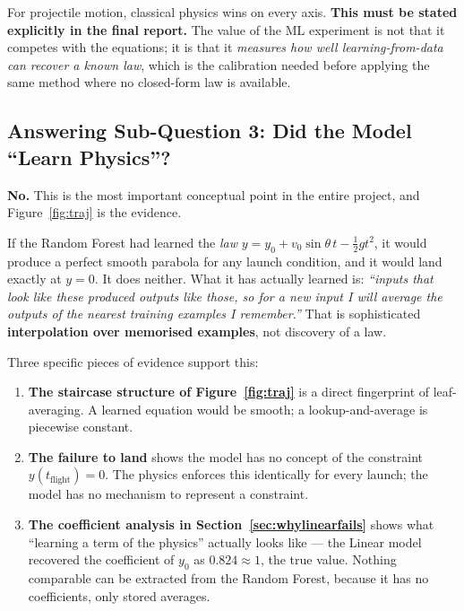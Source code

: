 \documentclass[11pt,a4paper]{article}
\newcommand{\vzero}{v_{0}}
\newcommand{\yzero}{y_{0}}
\begin{document}
For projectile motion, classical physics wins on every axis. \textbf{This must be stated explicitly
in the final report.} The value of the ML experiment is not that it competes with the equations; it
is that it \emph{measures how well learning-from-data can recover a known law}, which is the
calibration needed before applying the same method where no closed-form law is available.

\subsection{Answering Sub-Question 3: Did the Model ``Learn Physics''?}\label{sec:learnedphysics}

\textbf{No.} This is the most important conceptual point in the entire project, and
Figure~\ref{fig:traj} is the evidence.

If the Random Forest had learned the \emph{law}
$y=\yzero+\vzero\sin\theta\,t-\tfrac{1}{2}gt^{2}$, it would produce a perfect smooth parabola for
any launch condition, and it would land exactly at $y=0$. It does neither. What it has actually
learned is: \emph{``inputs that look like these produced outputs like those, so for a new input I
will average the outputs of the nearest training examples I remember.''} That is sophisticated
\textbf{interpolation over memorised examples}, not discovery of a law.

Three specific pieces of evidence support this:

\begin{enumerate}[leftmargin=2em,itemsep=0.2em]
  \item \textbf{The staircase structure of Figure~\ref{fig:traj}} is a direct fingerprint of
        leaf-averaging. A learned equation would be smooth; a lookup-and-average is piecewise
        constant.
  \item \textbf{The failure to land} shows the model has no concept of the constraint
        $y(t_{\text{flight}})=0$. The physics enforces this identically for every launch; the model
        has no mechanism to represent a constraint.
  \item \textbf{The coefficient analysis in Section~\ref{sec:whylinearfails}} shows what ``learning
        a term of the physics'' actually looks like --- the Linear model recovered the coefficient of
        $\yzero$ as $0.824\approx1$, the true value. Nothing comparable can be extracted from the
        Random Forest, because it has no coefficients, only stored averages.
\end{enumerate}
\end{document}
